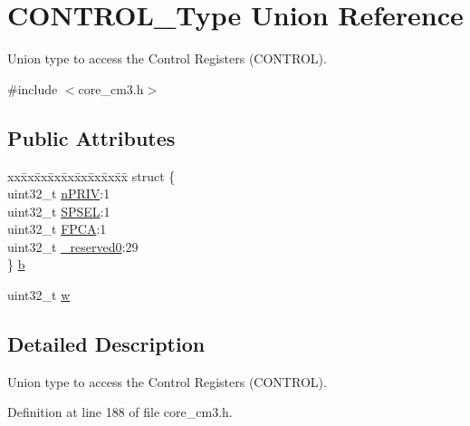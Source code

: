 \hypertarget{union_c_o_n_t_r_o_l___type}{\section{\-C\-O\-N\-T\-R\-O\-L\-\_\-\-Type \-Union \-Reference}
\label{union_c_o_n_t_r_o_l___type}
}


\-Union type to access the \-Control \-Registers (\-C\-O\-N\-T\-R\-O\-L).  




{\ttfamily \#include $<$core\-\_\-cm3.\-h$>$}

\subsection*{\-Public \-Attributes}
\begin{DoxyCompactItemize}
\item 
\begin{tabbing}
xx\=xx\=xx\=xx\=xx\=xx\=xx\=xx\=xx\=\kill
struct \{\\
\>uint32\_t \hyperlink{union_c_o_n_t_r_o_l___type_a35c1732cf153b7b5c4bd321cf1de9605}{nPRIV}:1\\
\>uint32\_t \hyperlink{union_c_o_n_t_r_o_l___type_a8cc085fea1c50a8bd9adea63931ee8e2}{SPSEL}:1\\
\>uint32\_t \hyperlink{union_c_o_n_t_r_o_l___type_ac62cfff08e6f055e0101785bad7094cd}{FPCA}:1\\
\>uint32\_t \hyperlink{union_c_o_n_t_r_o_l___type_af8c314273a1e4970a5671bd7f8184f50}{\_reserved0}:29\\
\} \hyperlink{union_c_o_n_t_r_o_l___type_adc6a38ab2980d0e9577b5a871da14eb9}{b}\\

\end{tabbing}\item 
uint32\-\_\-t \hyperlink{union_c_o_n_t_r_o_l___type_a6b642cca3d96da660b1198c133ca2a1f}{w}
\end{DoxyCompactItemize}


\subsection{\-Detailed \-Description}
\-Union type to access the \-Control \-Registers (\-C\-O\-N\-T\-R\-O\-L). 

\-Definition at line 188 of file core\-\_\-cm3.\-h.



